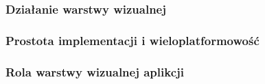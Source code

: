 \subsubsection{Działanie warstwy wizualnej}
\subsubsection{Prostota implementacji i wieloplatformowość}
\subsubsection{Rola warstwy wizualnej aplikcji}
